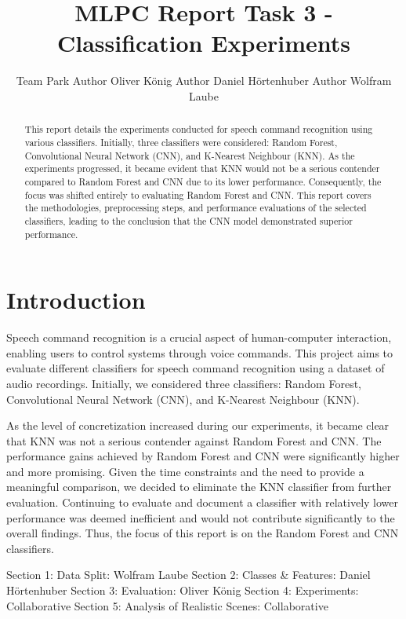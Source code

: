 \documentclass{article}
\title{MLPC Report Task 3 - Classification Experiments}
\author{%
  Team Park \And
  Author Oliver König \And
  Author Daniel Hörtenhuber \And
  Author Wolfram Laube
}
\begin{document}
\maketitle

\begin{abstract}
This report details the experiments conducted for speech command recognition using various classifiers. Initially, three classifiers were considered: Random Forest, Convolutional Neural Network (CNN), and K-Nearest Neighbour (KNN). As the experiments progressed, it became evident that KNN would not be a serious contender compared to Random Forest and CNN due to its lower performance. Consequently, the focus was shifted entirely to evaluating Random Forest and CNN. This report covers the methodologies, preprocessing steps, and performance evaluations of the selected classifiers, leading to the conclusion that the CNN model demonstrated superior performance.
\end{abstract}

\section{Introduction}
Speech command recognition is a crucial aspect of human-computer interaction, enabling users to control systems through voice commands. This project aims to evaluate different classifiers for speech command recognition using a dataset of audio recordings. Initially, we considered three classifiers: Random Forest, Convolutional Neural Network (CNN), and K-Nearest Neighbour (KNN).

As the level of concretization increased during our experiments, it became clear that KNN was not a serious contender against Random Forest and CNN. The performance gains achieved by Random Forest and CNN were significantly higher and more promising. Given the time constraints and the need to provide a meaningful comparison, we decided to eliminate the KNN classifier from further evaluation. Continuing to evaluate and document a classifier with relatively lower performance was deemed inefficient and would not contribute significantly to the overall findings. Thus, the focus of this report is on the Random Forest and CNN classifiers.

\begin{contributions}
  Section 1: Data Split: Wolfram Laube \AND
  Section 2: Classes & Features: Daniel Hörtenhuber \AND
  Section 3: Evaluation: Oliver König \AND
  Section 4: Experiments: Collaborative \AND
  Section 5: Analysis of Realistic Scenes: Collaborative
\end{contributions}







\end{document}
